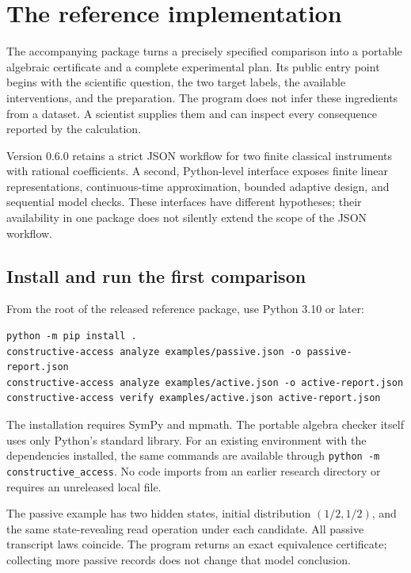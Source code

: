 \chapter{The reference implementation}
\label{toolkit:chapter}

The accompanying package turns a precisely specified comparison into a
portable algebraic certificate and a complete experimental plan. Its public
entry point begins with the scientific question, the two target labels, the
available interventions, and the preparation. The program does not infer
these ingredients from a dataset. A scientist supplies them and can inspect
every consequence reported by the calculation.

Version 0.6.0 retains a strict JSON workflow for two finite classical
instruments with rational coefficients. A second, Python-level interface
exposes finite linear representations, continuous-time approximation,
bounded adaptive design, and sequential model checks. These interfaces have
different hypotheses; their availability in one package does not silently
extend the scope of the JSON workflow.

\section{Install and run the first comparison}

From the root of the released reference package, use Python 3.10 or later:
\begin{verbatim}
python -m pip install .
constructive-access analyze examples/passive.json -o passive-report.json
constructive-access analyze examples/active.json -o active-report.json
constructive-access verify examples/active.json active-report.json
\end{verbatim}
The installation requires SymPy and mpmath. The portable algebra checker itself uses
only Python's standard library. For an existing environment with the
dependencies installed, the same commands are available through
\texttt{python -m constructive\_access}. No code imports from an earlier
research directory or requires an unreleased local file.

The passive example has two hidden states, initial distribution
$(1/2,1/2)$, and the same state-revealing read operation under each candidate.
All passive transcript laws coincide. The program returns an exact
equivalence certificate; collecting more passive records does not change
that model conclusion.

